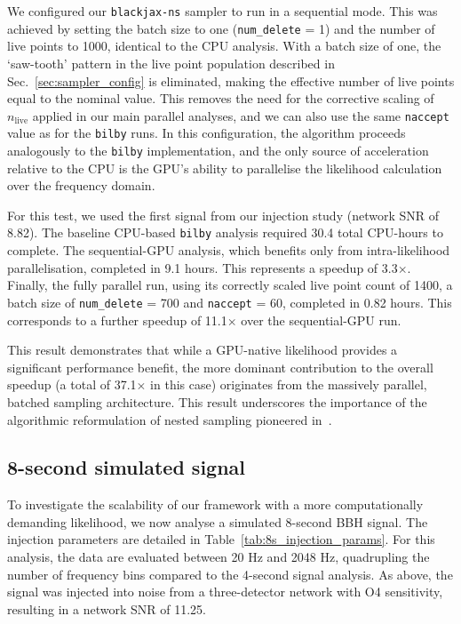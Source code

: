 \documentclass[fleqn,usenatbib]{mnras}
\begin{document}
We configured our \texttt{blackjax-ns} sampler to run in a sequential
mode. This was achieved by setting the batch size to one
(\texttt{num\_delete} = 1) and the number of live points to 1000,
identical to the CPU analysis. With a batch size of one, the
`saw-tooth' pattern in the live point population described in
Sec.~\ref{sec:sampler_config} is eliminated, making the effective
number of live points equal to the nominal value. This removes the need
for the corrective scaling of $n_{\text{live}}$ applied in our main
parallel analyses, and we can also use the same \texttt{naccept}
value as for the \texttt{bilby} runs. In this configuration, the algorithm proceeds
analogously to the \texttt{bilby} implementation, and the only source of
acceleration relative to the CPU is the GPU's ability to parallelise the
likelihood calculation over the frequency domain.

For this test, we used the first signal from our injection study (network
SNR of 8.82). The baseline CPU-based \texttt{bilby} analysis required
30.4 total CPU-hours to complete. The sequential-GPU analysis, which
benefits only from intra-likelihood parallelisation, completed in
9.1 hours. This represents a speedup of 3.3$\times$. Finally, the
fully parallel run, using its correctly scaled live point count of 1400,
a batch size of \texttt{num\_delete} = 700 and {\texttt{naccept} = 60}, completed in 0.82 hours.
This corresponds to a further speedup of 11.1$\times$ over the
sequential-GPU run.

This result demonstrates that while a GPU-native likelihood provides
a significant performance benefit, the more dominant contribution to the
overall speedup (a total of 37.1$\times$ in this case) originates from the
massively parallel, batched sampling architecture. This result
underscores the importance of the algorithmic reformulation 
of nested sampling pioneered in~\cite{yallup2025nested}.


\subsection{8-second simulated signal}
\label{sec:8s_simulated_signal}

To investigate the scalability of our framework with a more
computationally demanding likelihood, we now analyse a simulated
8-second BBH signal. The injection parameters are detailed in
Table~\ref{tab:8s_injection_params}. For this analysis, the data are
evaluated between 20 Hz and 2048 Hz, quadrupling the number of
frequency bins compared to the 4-second signal analysis. As above, the signal was
injected into noise from a three-detector network with O4 sensitivity,
resulting in a network SNR of 11.25.
\end{document}
